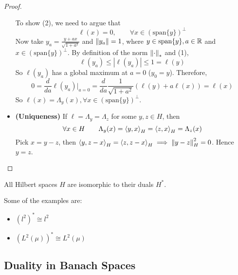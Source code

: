 \documentclass{article}
\begin{document}
\begin{proof}
\begin{itemize}
        To show (2), we need to argue that 
        \begin{equation*}
            \ell(x)=0, \qquad \forall x \in (\textrm{span}\{y\})^{\perp}
        \end{equation*}  
        Now take $y_a = \frac{y+ax}{\sqrt{1+a^2}}$ and $\left\|{y_a}\right\|=1$, where $y \in \textrm{span}\{y\}, a\in \mathbb{R}$ and $x \in (\textrm{span}\{y\})^{\perp}$. By definition of the norm $\left\|{\cdot}\right\|_*$ and (1),  
        \begin{equation*}
            \ell(y_a)  \leq |\ell(y_a)| \leq 1 = \ell(y)
        \end{equation*}  
        So $\ell(y_a)$ has a global maximum at $a=0$ ($y_0=y$). Therefore,  
        \begin{equation*}
            0 = \frac{d}{da} \ell(y_a) \Bigr|_{a=0} = \frac{d}{da} \frac{1}{\sqrt{1+a^2}} (\ell(y)+a\ell(x))=\ell(x)
        \end{equation*}  
        So $\ell(x)=\Lambda_y(x), \forall x \in (\textrm{span}\{y\})^{\perp}$.
        
        \item \textbf{(Uniqueness)}  
        If $\ell=\Lambda_y=\Lambda_z$ for some $y,z \in H$, then  
        $$
        \forall x \in H \qquad \Lambda_y(x) = \left<{y},{x}\right>_H = \left<{z},{x}\right>_H = \Lambda_z(x)
        $$  
        Pick $x=y-z$, then $\left<{y},{z-x}\right>_H = \left<{z},{z-x}\right>_H \implies \left\|{y-z}\right\|_H^2=0$. Hence $y=z$.
    \end{itemize}
\end{proof}

\begin{corollary}
    All Hilbert spaces $H$ are isomorphic to their duals $H^*$.
\end{corollary}  

\begin{unexaminable}
\begin{example}
    Some of the examples are:  
    \begin{itemize}
        \item $(l^2)^* \cong l^2$
        \item $(L^2(\mu))^* \cong L^2(\mu)$
    \end{itemize}
\end{example}
\end{unexaminable}

\subsection{Duality in Banach Spaces}  
\end{document}
